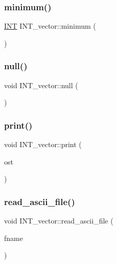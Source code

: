 \subsubsection{\texorpdfstring{minimum()}{minimum()}}
{\footnotesize\ttfamily \mbox{\hyperlink{galois_8h_a09fddde158a3a20bd2dcadb609de11dc}{I\+NT}} I\+N\+T\+\_\+vector\+::minimum (\begin{DoxyParamCaption}{ }\end{DoxyParamCaption})}

\mbox{\label{class_i_n_t__vector_aead7b6a3b0d430ccfd3e023132fb163c}} 
\subsubsection{\texorpdfstring{null()}{null()}}
{\footnotesize\ttfamily void I\+N\+T\+\_\+vector\+::null (\begin{DoxyParamCaption}{ }\end{DoxyParamCaption})}

\mbox{\label{class_i_n_t__vector_ad96578c185d718b117f3be6d06f6069e}} 
\subsubsection{\texorpdfstring{print()}{print()}}
{\footnotesize\ttfamily void I\+N\+T\+\_\+vector\+::print (\begin{DoxyParamCaption}\item[{ostream \&}]{ost }\end{DoxyParamCaption})}

\mbox{\label{class_i_n_t__vector_ac39f7ae050d29ea8dadf2962c404aaba}} 
\subsubsection{\texorpdfstring{read\+\_\+ascii\+\_\+file()}{read\_ascii\_file()}}
{\footnotesize\ttfamily void I\+N\+T\+\_\+vector\+::read\+\_\+ascii\+\_\+file (\begin{DoxyParamCaption}\item[{const \mbox{\hyperlink{galois_8h_ab6cc7b4aeb6ea31aba2b3fbfc83ff5e6}{B\+Y\+TE}} $\ast$}]{fname }\end{DoxyParamCaption})}


